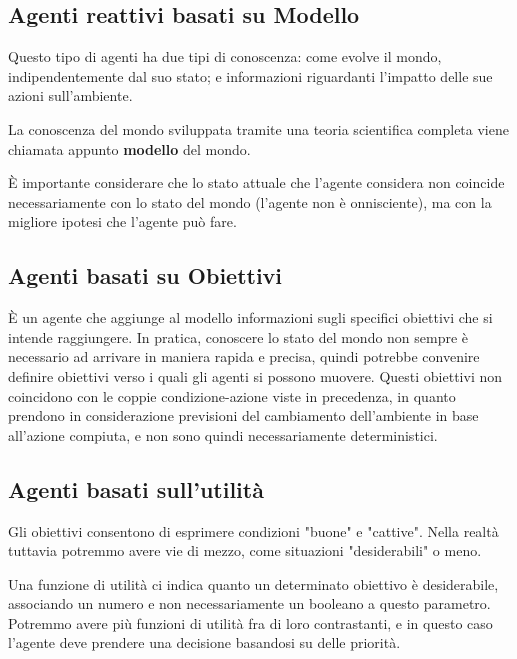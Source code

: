     \subsection{Agenti reattivi basati su Modello}
        Questo tipo di agenti ha due tipi di conoscenza: come evolve il mondo, indipendentemente dal suo stato; e informazioni riguardanti l'impatto delle sue azioni sull'ambiente.
        
        La conoscenza del mondo sviluppata tramite una teoria scientifica completa viene chiamata appunto \textbf{modello} del mondo.
        
        È importante considerare che lo stato attuale che l'agente considera non coincide necessariamente con lo stato del mondo (l'agente non è onnisciente), ma con la migliore ipotesi che l'agente può fare.
        
    \subsection{Agenti basati su Obiettivi}
        È un agente che aggiunge al modello informazioni sugli specifici obiettivi che si intende raggiungere. In pratica, conoscere lo stato del mondo non sempre è necessario ad arrivare in maniera rapida e precisa, quindi potrebbe convenire definire obiettivi verso i quali gli agenti si possono muovere. Questi obiettivi non coincidono con le coppie condizione-azione viste in precedenza, in quanto prendono in considerazione previsioni del cambiamento dell'ambiente in base all'azione compiuta, e non sono quindi necessariamente deterministici.
        
    \subsection{Agenti basati sull'utilità}
        Gli obiettivi consentono di esprimere condizioni "buone" e "cattive". Nella realtà tuttavia  potremmo avere vie di mezzo, come situazioni "desiderabili" o meno.
        
        Una funzione di utilità ci indica quanto un determinato obiettivo è desiderabile, associando un numero e non necessariamente un booleano a questo parametro. Potremmo avere più funzioni di utilità fra di loro contrastanti, e in questo caso l'agente deve prendere una decisione basandosi su delle priorità.
        
